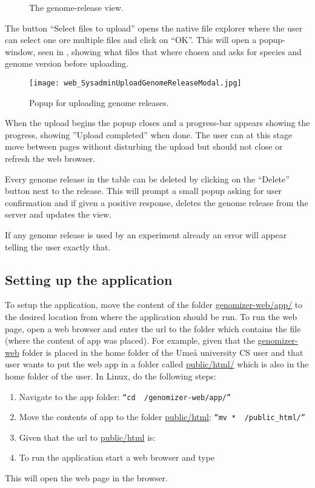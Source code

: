 \begin{figure}[h]
 \caption{The genome-release view.}
 \label{adm_web_genomereleaseView}
\end{figure}

The button “Select files to upload” opens the native file explorer where the user can select one ore multiple files and click on “OK”. This will open a popup-window, seen in , showing what files that where chosen and asks for species and genome version before uploading. 

\begin{figure}[h]
 \centering
 \texttt{[image: web\_SysadminUploadGenomeReleaseModal.jpg]}
 \caption{Popup for uploading genome releases.}
 \label{adm_web_uploadconfirm}
\end{figure}

When the upload begins the popup closes and a progress-bar appears showing the progress, showing ''Upload completed'' when done. The user can at this stage move between pages without disturbing the upload but should not close or refresh the web browser. 

Every genome release in the table can be deleted by clicking on the “Delete” button next to the release. This will prompt a small popup asking for user confirmation and if given a positive response, deletes the genome release from the server and updates the view. 

If any genome release is used by an experiment already an error will appear telling the user exactly that. 

\subsection{Setting up the application}
To setup the application, move the content of the folder \url{genomizer-web/app/} to the desired location from where the application should be run. To run the web page, open a web browser and enter the url to the folder which contains the  file (where the content of app was placed).
For example, given that the \url{genomizer-web} folder is placed in the home folder of the Umeå university CS user  and that user wants to put the web app in a folder called \url{public/html/} which is also in the home folder of the user. In Linux, do the following steps:
\begin{enumerate}
	\item Navigate to the app folder: \texttt{“cd ~/genomizer-web/app/”}
	\item Move the contents of app to the folder \url{public/html}: \texttt{“mv * ~/public\_html/”}
	\item Given that the url to \url{public/html} is: 
	\item To run the application start a web browser and type 
\end{enumerate}
This will open the web page in the browser.


